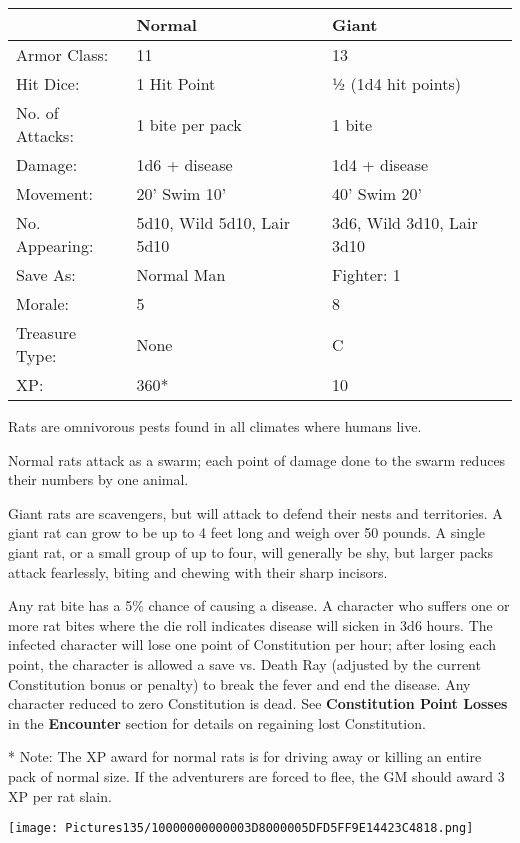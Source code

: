 \documentclass[a4paper,twoside,openany,10pt]{book}
\begin{document}
\begin{multicols}{2}
\begin{tabularx}{0.50\textwidth}{@{}lXX@{}}
& Normal & Giant \\\hline
Armor Class: & 11 & 13 \\\hline
Hit Dice: & 1 Hit Point & ½ (1d4 hit points) \\\hline
No. of Attacks: & 1 bite per pack & 1 bite \\\hline
Damage: & 1d6 + disease & 1d4 + disease \\\hline
Movement: & 20' Swim 10' &
40' Swim 20' \\\hline
No. Appearing: & 5d10, Wild 5d10,  Lair 5d10 & 3d6, Wild 3d10, Lair 3d10 \\\hline
Save As: & Normal Man & Fighter: 1 \\\hline
Morale: & 5 & 8 \\\hline
Treasure Type: & None & C \\\hline
XP: & 360* & 10 \\\hline
\end{tabularx}

Rats are omnivorous pests found in all climates where humans live.

Normal rats attack as a swarm; each point of damage done to the swarm reduces their numbers by one animal.


Giant rats are scavengers, but will attack to defend their nests and territories. A giant rat can grow to be up to 4 feet long and weigh over 50 pounds. A single giant rat, or a small group of up to four, will generally be shy, but larger packs attack fearlessly, biting and chewing with their sharp incisors.

Any rat bite has a 5\% chance of causing a disease. A character who suffers  one or more rat bites where the die roll indicates disease will sicken in 3d6 hours. The infected character will lose one point of Constitution per hour; after losing each point, the character is allowed a save vs. Death Ray (adjusted by the current Constitution bonus or penalty) to break the fever and end the disease. Any character reduced to zero Constitution is dead. See \textbf{Constitution Point Losses} in the \textbf{Encounter} section for details on regaining lost Constitution. 

* Note: The XP award for normal rats is for driving away or killing an entire pack of normal size. If the adventurers are forced to flee, the
GM should award 3 XP per rat slain.

\begin{center}
	\texttt{[image: Pictures135/10000000000003D8000005DFD5FF9E14423C4818.png]}
\end{center}



\end{multicols}
\end{document}
